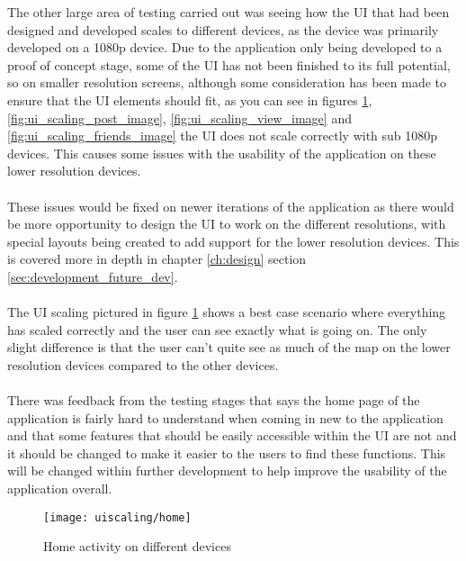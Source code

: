 The other large area of testing carried out was seeing how the UI that had been designed and developed scales to different devices, as the device was primarily developed on a 1080p device. Due to the application only being developed to a proof of concept stage, some of the UI has not been finished to its full potential, so on smaller resolution screens, although some consideration has been made to ensure that the UI elements should fit, as you can see in figures \ref{fig:ui_scaling_home_image}, \ref{fig:ui_scaling_post_image}, \ref{fig:ui_scaling_view_image} and \ref{fig:ui_scaling_friends_image} the UI does not scale correctly with sub 1080p devices. This causes some issues with the usability of the application on these lower resolution devices.\\
\\
These issues would be fixed on newer iterations of the application as there would be more opportunity to design the UI to work on the different resolutions, with special layouts being created to add support for the lower resolution devices. This is covered more in depth in chapter \ref{ch:design} section \ref{sec:development_future_dev}.\\
\\
The UI scaling pictured in figure \ref{fig:ui_scaling_home_image} shows a best case scenario where everything has scaled correctly and the user can see exactly what is going on. The only slight difference is that the user can't quite see as much of the map on the lower resolution devices compared to the other devices.\\
\\
There was feedback from the testing stages that says the home page of the application is fairly hard to understand when coming in new to the application and that some features that should be easily accessible within the UI are not and it should be changed to make it easier to the users to find these functions. This will be changed within further development to help improve the usability of the application overall.

\begin{figure}[H]
    \centering
    \texttt{[image: uiscaling/home]}
    \caption{Home activity on different devices}
    \label{fig:ui_scaling_home_image}
\end{figure}

